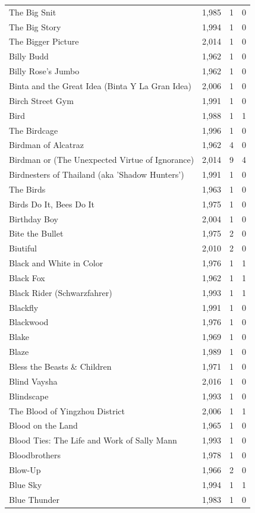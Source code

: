 \begin{tabular}{lrrr}
The Big Snit & 1,985 & 1 & 0 \\
The Big Story & 1,994 & 1 & 0 \\
The Bigger Picture & 2,014 & 1 & 0 \\
Billy Budd & 1,962 & 1 & 0 \\
Billy Rose's Jumbo & 1,962 & 1 & 0 \\
Binta and the Great Idea (Binta Y La Gran Idea) & 2,006 & 1 & 0 \\
Birch Street Gym & 1,991 & 1 & 0 \\
Bird & 1,988 & 1 & 1 \\
The Birdcage & 1,996 & 1 & 0 \\
Birdman of Alcatraz & 1,962 & 4 & 0 \\
Birdman or (The Unexpected Virtue of Ignorance) & 2,014 & 9 & 4 \\
Birdnesters of Thailand (aka 'Shadow Hunters') & 1,991 & 1 & 0 \\
The Birds & 1,963 & 1 & 0 \\
Birds Do It, Bees Do It & 1,975 & 1 & 0 \\
Birthday Boy & 2,004 & 1 & 0 \\
Bite the Bullet & 1,975 & 2 & 0 \\
Biutiful & 2,010 & 2 & 0 \\
Black and White in Color & 1,976 & 1 & 1 \\
Black Fox & 1,962 & 1 & 1 \\
Black Rider (Schwarzfahrer) & 1,993 & 1 & 1 \\
Blackfly & 1,991 & 1 & 0 \\
Blackwood & 1,976 & 1 & 0 \\
Blake & 1,969 & 1 & 0 \\
Blaze & 1,989 & 1 & 0 \\
Bless the Beasts \& Children & 1,971 & 1 & 0 \\
Blind Vaysha & 2,016 & 1 & 0 \\
Blindscape & 1,993 & 1 & 0 \\
The Blood of Yingzhou District & 2,006 & 1 & 1 \\
Blood on the Land & 1,965 & 1 & 0 \\
Blood Ties: The Life and Work of Sally Mann & 1,993 & 1 & 0 \\
Bloodbrothers & 1,978 & 1 & 0 \\
Blow-Up & 1,966 & 2 & 0 \\
Blue Sky & 1,994 & 1 & 1 \\
Blue Thunder & 1,983 & 1 & 0 \\

\end{tabular}
